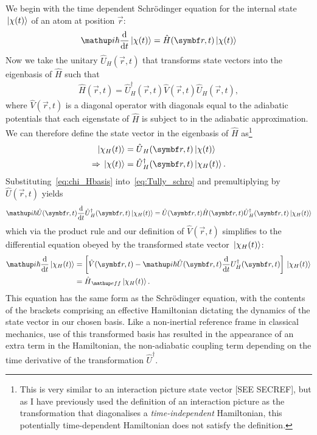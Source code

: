 We begin with the time dependent Schr\"odinger equation for the internal state $\ket{\chi(t)}$ of an atom at position $\vec r$:
\begin{align}
\ii\hbar\dv{t}\ket{\chi(t)} = \hat H(\vec r, t)\ket{\chi(t)}\label{eq:Tully_schro}
\end{align}
Now we take the unitary $\hat U_H(\vec r, t)$ that transforms state vectors into the eigenbasis of $\hat H$ such that
\begin{align}
\hat H(\vec r, t) = \hat U_H^\dagger(\vec r, t) \hat V(\vec r, t) \hat U_H(\vec r, t),
\end{align}
where $\hat V(\vec r, t)$ is a diagonal operator with diagonals equal to the adiabatic potentials that each eigenstate of $\hat H$ is subject to in the adiabatic approximation.
We can therefore define the state vector in the eigenbasis of $\hat H$ as\footnote{This is very similar to an interaction picture state vector [SEE SECREF], but as I have previously used the definition of an interaction picture as the transformation that diagonalises a \emph{time-independent} Hamiltonian, this potentially time-dependent Hamiltonian does not satisfy the definition.}
\begin{align}\label{eq:chi_Hbasis}
\ket{\chi_H(t)} &= \hat U_H(\vec r, t)\ket{\chi(t)}\\
\Rightarrow \ket{\chi(t)} &= \hat U^\dagger_H(\vec r, t)\ket{\chi_H(t)}.
\end{align}
Substituting~\eqref{eq:chi_Hbasis} into~\eqref{eq:Tully_schro} and premultiplying by $\hat U(\vec r, t)$ yields
\begin{align}
\ii\hbar\hat U(\vec r, t)\dv{t}\hat U^\dagger_H(\vec r, t)\ket{\chi_H(t)} = \hat U(\vec r, t)\hat H(\vec r, t)\hat U^\dagger_H(\vec r, t)\ket{\chi_H(t)}
\end{align}
which via the product rule and our definition of $\hat V(\vec r, t)$ simplifies to the differential equation obeyed by the transformed state vector $\ket{\chi_H(t)}$:
\begin{align}\label{eq:Tully_adiabatic_schro}
\ii\hbar\dv{t}\ket{\chi_H(t)} &= \left[
  \hat V(\vec r, t)
  - \ii\hbar\hat U(\vec r, t)\dv{t}U^\dagger_H(\vec r, t)
 \right]\ket{\chi_H(t)}\\
 &= \hat H_\up{eff} \ket{\chi_H(t)}.\label{eq:Tully_adiabatic_eff}
\end{align}
This equation has the same form as the Schr\"odinger equation, with the contents of the brackets comprising an effective Hamiltonian dictating the dynamics of the state vector in our chosen basis. Like a non-inertial reference frame in classical mechanics, use of this transformed basis has resulted in the appearance of an extra term in the Hamiltonian, the non-adiabatic coupling term depending on the time derivative of the transformation $\hat U^\dagger$.

